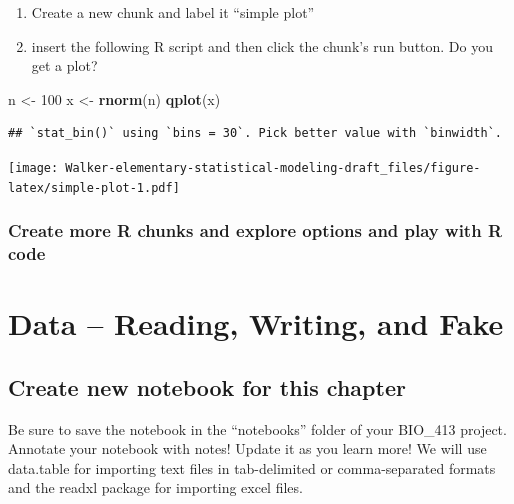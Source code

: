 \documentclass[]{book}
\newenvironment{Shaded}{\begin{snugshade}}{\end{snugshade}}
\newcommand{\KeywordTok}[1]{\textcolor[rgb]{0.13,0.29,0.53}{\textbf{#1}}}
\newcommand{\DataTypeTok}[1]{\textcolor[rgb]{0.13,0.29,0.53}{#1}}
\newcommand{\DecValTok}[1]{\textcolor[rgb]{0.00,0.00,0.81}{#1}}
\newcommand{\StringTok}[1]{\textcolor[rgb]{0.31,0.60,0.02}{#1}}
\newcommand{\OperatorTok}[1]{\textcolor[rgb]{0.81,0.36,0.00}{\textbf{#1}}}
\newcommand{\NormalTok}[1]{#1}
\providecommand{\tightlist}{%
  \setlength{\itemsep}{0pt}\setlength{\parskip}{0pt}}
\begin{document}
\begin{enumerate}
\def\labelenumi{\arabic{enumi}.}
\setcounter{enumi}{3}
\tightlist
\item
  Create a new chunk and label it ``simple plot''
\item
  insert the following R script and then click the chunk's run button.
  Do you get a plot?
\end{enumerate}

\begin{Shaded}
\begin{Highlighting}[]
\NormalTok{n <-}\StringTok{ }\DecValTok{100}
\NormalTok{x <-}\StringTok{ }\KeywordTok{rnorm}\NormalTok{(n)}
\KeywordTok{qplot}\NormalTok{(x)}
\end{Highlighting}
\end{Shaded}

\begin{verbatim}
## `stat_bin()` using `bins = 30`. Pick better value with `binwidth`.
\end{verbatim}

\texttt{[image: Walker-elementary-statistical-modeling-draft\_files/figure-latex/simple-plot-1.pdf]}

\subsection{Create more R chunks and explore options and play with R
code}\label{create-more-r-chunks-and-explore-options-and-play-with-r-code}

\chapter{Data -- Reading, Writing, and
Fake}\label{data-reading-writing-and-fake}

\section{Create new notebook for this
chapter}\label{create-new-notebook-for-this-chapter}

Be sure to save the notebook in the ``notebooks'' folder of your
BIO\_413 project. Annotate your notebook with notes! Update it as you
learn more! We will use data.table for importing text files in
tab-delimited or comma-separated formats and the readxl package for
importing excel files.

\begin{Shaded}
\end{Shaded}
\end{document}
